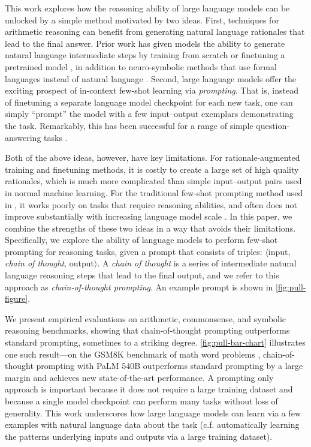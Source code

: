 \documentclass[]{article}
\theoremstyle{plain}
\theoremstyle{definition}
\theoremstyle{remark}
\newcommand{\palm}[0]{PaLM}
\begin{document}
This work explores how the reasoning ability of large language models can be unlocked by a simple method motivated by two ideas. %
First, techniques for arithmetic reasoning can benefit from generating natural language rationales that lead to the final answer.
Prior work has given models the ability to generate natural language intermediate steps by training from scratch \citep{ling-etal-2017-program} or finetuning a pretrained model \citep{cobbe2021training}, in addition to neuro-symbolic methods that use formal languages instead of natural language \citep{roy-roth-2015-solving, chiang-chen-2019-semantically,amini-etal-2019-mathqa, chen2019neural}.
Second, large language models offer the exciting prospect of in-context few-shot learning via \emph{prompting}.
That is, instead of finetuning a separate language model checkpoint for each new task, one can simply ``prompt'' the model with a few input--output exemplars demonstrating the task.
Remarkably, this has been successful for a range of simple question-answering tasks \citep{brown2020language}.

Both of the above ideas, however, have key limitations. For rationale-augmented training and finetuning methods, it is costly to create a large set of high quality rationales, which is much more complicated than simple input--output pairs used in normal machine learning. 
For the traditional few-shot prompting method used in \citet{brown2020language}, it works poorly on tasks that require reasoning abilities, and often does not improve substantially with increasing language model scale \citep{rae2021scaling}. 
In this paper, we combine the strengths of these two ideas in a way that avoids their limitations. Specifically, we explore the ability of language models to perform few-shot prompting for reasoning tasks, given a prompt that consists of triples: $\langle$input, \emph{chain of thought}, output$\rangle$.
A \emph{chain of thought} is a series of intermediate natural language reasoning steps that lead to the final output, and we refer to this approach as \textit{chain-of-thought prompting}. An example prompt is shown in \cref{fig:pull-figure}. %


We present empirical evaluations on arithmetic, commonsense, and symbolic reasoning benchmarks, showing that chain-of-thought prompting outperforms standard prompting, sometimes to a striking degree.
\cref{fig:pull-bar-chart} illustrates one such result---on the GSM8K benchmark of math word problems \citep{cobbe2021training}, chain-of-thought prompting with \palm{} 540B outperforms standard prompting by a large margin and achieves new state-of-the-art performance.
A prompting only approach is important because it does not require a large training dataset and because a single model checkpoint can perform many tasks without loss of generality.
This work underscores how large language models can learn via a few examples with natural language data about the task (c.f. automatically learning the patterns underlying inputs and outputs via a large training dataset).
\end{document}
